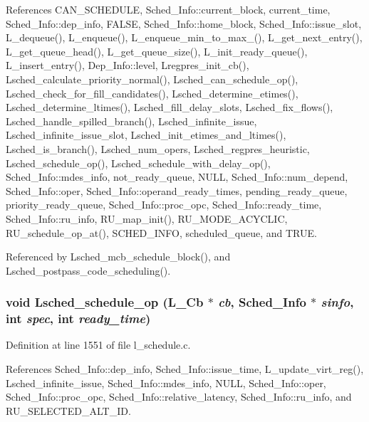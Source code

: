 References CAN\_\-SCHEDULE, Sched\_\-Info::current\_\-block, current\_\-time, Sched\_\-Info::dep\_\-info, FALSE, Sched\_\-Info::home\_\-block, Sched\_\-Info::issue\_\-slot, L\_\-dequeue(), L\_\-enqueue(), L\_\-enqueue\_\-min\_\-to\_\-max\_(), L\_\-get\_\-next\_\-entry(), L\_\-get\_\-queue\_\-head(), L\_\-get\_\-queue\_\-size(), L\_\-init\_\-ready\_\-queue(), L\_\-insert\_\-entry(), Dep\_\-Info::level, Lregpres\_\-init\_\-cb(), Lsched\_\-calculate\_\-priority\_\-normal(), Lsched\_\-can\_\-schedule\_\-op(), Lsched\_\-check\_\-for\_\-fill\_\-candidates(), Lsched\_\-determine\_\-etimes(), Lsched\_\-determine\_\-ltimes(), Lsched\_\-fill\_\-delay\_\-slots, Lsched\_\-fix\_\-flows(), Lsched\_\-handle\_\-spilled\_\-branch(), Lsched\_\-infinite\_\-issue, Lsched\_\-infinite\_\-issue\_\-slot, Lsched\_\-init\_\-etimes\_\-and\_\-ltimes(), Lsched\_\-is\_\-branch(), Lsched\_\-num\_\-opers, Lsched\_\-regpres\_\-heuristic, Lsched\_\-schedule\_\-op(), Lsched\_\-schedule\_\-with\_\-delay\_\-op(), Sched\_\-Info::mdes\_\-info, not\_\-ready\_\-queue, NULL, Sched\_\-Info::num\_\-depend, Sched\_\-Info::oper, Sched\_\-Info::operand\_\-ready\_\-times, pending\_\-ready\_\-queue, priority\_\-ready\_\-queue, Sched\_\-Info::proc\_\-opc, Sched\_\-Info::ready\_\-time, Sched\_\-Info::ru\_\-info, RU\_\-map\_\-init(), RU\_\-MODE\_\-ACYCLIC, RU\_\-schedule\_\-op\_\-at(), SCHED\_\-INFO, scheduled\_\-queue, and TRUE.

Referenced by Lsched\_\-mcb\_\-schedule\_\-block(), and Lsched\_\-postpass\_\-code\_\-scheduling().
\subsubsection{\setlength{\rightskip}{0pt plus 5cm}void Lsched\_\-schedule\_\-op (L\_\-Cb $\ast$ {\em cb}, \bf{Sched\_\-Info} $\ast$ {\em sinfo}, int {\em spec}, int {\em ready\_\-time})}\label{l__schedule_8c_53b29f1251e9c43df47311cd38555125}




Definition at line 1551 of file l\_\-schedule.c.

References Sched\_\-Info::dep\_\-info, Sched\_\-Info::issue\_\-time, L\_\-update\_\-virt\_\-reg(), Lsched\_\-infinite\_\-issue, Sched\_\-Info::mdes\_\-info, NULL, Sched\_\-Info::oper, Sched\_\-Info::proc\_\-opc, Sched\_\-Info::relative\_\-latency, Sched\_\-Info::ru\_\-info, and RU\_\-SELECTED\_\-ALT\_\-ID.

